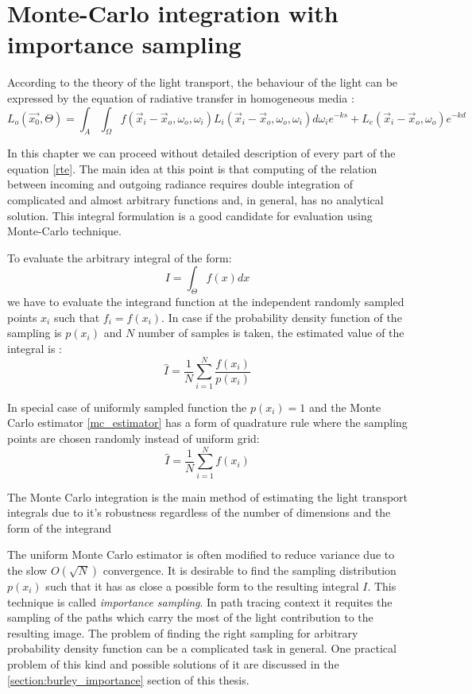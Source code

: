 \section{Monte-Carlo integration with importance sampling}
\label{section:importance_sampling}
According to the theory of the light transport, the behaviour of the light can be expressed by the
equation of radiative transfer in homogeneous media \cite{Lafortune:1996:RPM:275458.275468}:
\begin{equation}
\label{rte}
L_o(\vec{x_0}, \Theta) = \int_{A} \int_{\Omega} f(\vec{x}_i-\vec{x}_o,\omega_o,\omega_i)
L_i(\vec{x}_i-\vec{x}_o, \omega_o, \omega_i) d\omega_i e^{-ks} + L_e(\vec{x}_i-\vec{x}_o, \omega_o)
e^{-kd}
\end{equation}

In this chapter we can proceed without detailed description of every part of the equation \ref{rte}.
The main idea at this point is that computing of the relation between incoming and outgoing radiance
requires double integration of complicated and almost arbitrary functions and, in general, has no
analytical solution. This integral formulation is a good candidate for evaluation using Monte-Carlo
technique.

To evaluate the arbitrary integral of the form:
\[
I = \int_\Theta f(x) dx
\]
we have to evaluate the integrand function at the independent randomly sampled points $x_i$ such
that $f_i = f(x_i)$. In case if the probability density function of the sampling is $p(x_i)$ and $N$
number of samples is taken, the estimated value of the integral is \cite{hammersley64}:
\begin{equation}
\label{mc_estimator}
\hat{I}=\frac{1}{N}\sum_{i=1}^N\frac{f(x_i)}{p(x_i)}
\end{equation}

In special case of uniformly sampled function the $p(x_i)=1$ and the Monte Carlo estimator
\ref{mc_estimator} has a form of quadrature rule where the sampling points are chosen randomly
instead of uniform grid:
\begin{equation}
\label{uniform_estimator}
\hat{I}=\frac{1}{N}\sum_{i=1}^N f(x_i)
\end{equation}

The Monte Carlo integration is the main method of estimating the light transport integrals due to
it's robustness regardless of the number of dimensions and the form of the integrand
\cite{Veach:1998:RMC:927297}

The uniform Monte Carlo estimator is often modified to reduce variance due to the slow $O(\sqrt{N})$
convergence. It is desirable to find the sampling distribution $p(x_i)$ such that it has as close a
possible form to the resulting integral $I$. This technique is called \emph{importance sampling}. In
path tracing context it requites the sampling of the paths which carry the most of the light
contribution to the resulting image. The problem of finding the right sampling for arbitrary
probability density function can be a complicated task in general. One practical problem of this
kind and possible solutions of it are discussed in the \ref{section:burley_importance} section of
this thesis.